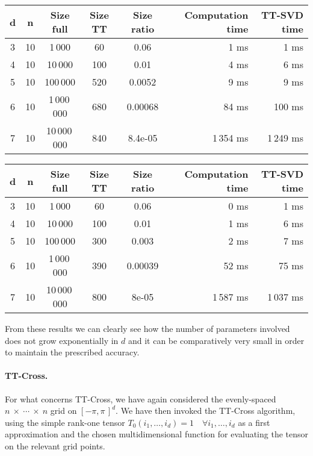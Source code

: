 \begin{center}
  \begin{tabular}[ht]{cccccrr}
    \toprule
    d & n  & Size full & Size TT & Size ratio & Computation time & TT-SVD time\\ \midrule
    3 & 10 & 1\,000      &60&0.06 & 1 ms & 1 ms\\
    4 & 10 & 10\,000     &100&0.01 & 4 ms & 6 ms\\
    5 & 10 & 100\,000    &520&0.0052 & 9 ms & 9 ms\\
    6 & 10 & 1\,000\,000   &680&0.00068 & 84 ms & 100 ms\\
    7 & 10 & 10\,000\,000  &840&8.4e-05& 1\,354 ms & 1\,249 ms\\ \bottomrule
  \end{tabular}
\end{center}

\begin{center}
  \begin{tabular}[ht]{cccccrr}
    \toprule
    d & n  & Size full & Size TT & Size ratio & Computation time & TT-SVD time\\ \midrule
    3 & 10 & 1\,000      &60&0.06& 0 ms & 1 ms\\
    4 & 10 & 10\,000     &100&0.01& 1 ms & 6 ms\\
    5 & 10 & 100\,000    &300&0.003& 2 ms & 7 ms\\
    6 & 10 & 1\,000\,000   &390&0.00039& 52 ms & 75 ms\\
    7 & 10 & 10\,000\,000  &800&8e-05& 1\,587 ms & 1\,037 ms\\ \bottomrule
  \end{tabular}
\end{center}

From these results we can clearly see how the number of parameters involved does not grow exponentially in $d$ and it can be comparatively very small in order to maintain the prescribed accuracy.

\paragraph{TT-Cross.}
For what concerns TT-Cross, we have again considered the evenly-spaced $n~\times~\cdots~\times~n$ grid on $[-\pi,\pi\,]^d$. We have then invoked the TT-Cross algorithm, using the simple rank-one tensor $T_0(i_1,\ldots,i_d) = 1 \quad \forall i_1,\ldots,i_d$ as a first approximation and the chosen multidimensional function for evaluating the tensor on the relevant grid points.

